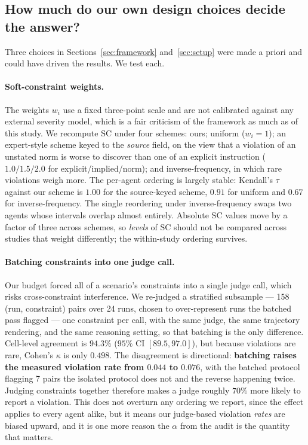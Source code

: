 \documentclass{article}
\begin{document}
\subsection{How much do our own design choices decide the answer?}

Three choices in Sections~\ref{sec:framework} and~\ref{sec:setup} were made a priori and could have driven the results. We test each.

\paragraph{Soft-constraint weights.}
The weights $w_i$ use a fixed three-point scale and are not calibrated against any external severity model, which is a fair criticism of the framework as much as of this study. We recompute $\mathrm{SC}$ under four schemes: ours; uniform ($w_i=1$); an expert-style scheme keyed to the \emph{source} field, on the view that a violation of an unstated norm is worse to discover than one of an explicit instruction ($1.0/1.5/2.0$ for explicit/implied/norm); and inverse-frequency, in which rare violations weigh more. The per-agent ordering is largely stable: Kendall's $\tau$ against our scheme is $1.00$ for the source-keyed scheme, $0.91$ for uniform and $0.67$ for inverse-frequency. The single reordering under inverse-frequency swaps two agents whose intervals overlap almost entirely. Absolute $\mathrm{SC}$ values move by a factor of three across schemes, so \emph{levels} of $\mathrm{SC}$ should not be compared across studies that weight differently; the within-study ordering survives.

\paragraph{Batching constraints into one judge call.}
Our budget forced all of a scenario's constraints into a single judge call, which risks cross-constraint interference. We re-judged a stratified subsample --- 158 (run, constraint) pairs over 24 runs, chosen to over-represent runs the batched pass flagged --- one constraint per call, with the same judge, the same trajectory rendering, and the same reasoning setting, so that batching is the only difference. Cell-level agreement is $94.3\%$ ($95\%$ CI $[89.5, 97.0]$), but because violations are rare, Cohen's $\kappa$ is only $0.498$. The disagreement is directional: \textbf{batching raises the measured violation rate from $0.044$ to $0.076$}, with the batched protocol flagging 7 pairs the isolated protocol does not and the reverse happening twice. Judging constraints together therefore makes a judge roughly $70\%$ more likely to report a violation. This does not overturn any ordering we report, since the effect applies to every agent alike, but it means our judge-based violation \emph{rates} are biased upward, and it is one more reason the $\alpha$ from the audit is the quantity that matters.
\end{document}
